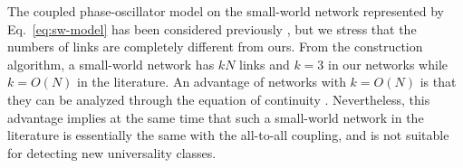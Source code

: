 
The coupled phase-oscillator model on the small-world network
represented by Eq.~\eqref{eq:sw-model} has been considered previously
\cite{chiba2018,medvedev2014},
but we stress that the numbers of links are completely different from ours.
From the construction algorithm, a small-world network has $kN$ links
and $k=3$ in our networks while $k=O(N)$ in the literature.
An advantage of networks with $k=O(N)$ is that they can be analyzed
through the equation of continuity \cite{laszlo2012}.
Nevertheless, this advantage implies at the same time
that such a small-world network in the literature
is essentially the same with the all-to-all coupling,
and is not suitable for detecting new universality classes.



